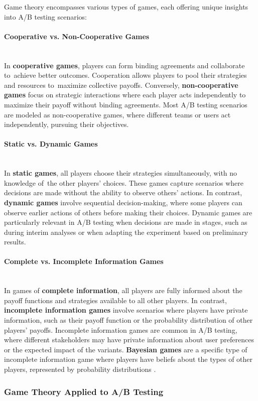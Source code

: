 \documentclass[magisterska, english]{pwr_wmat_praca_dyplomowa}
\theoremstyle{plain}
\numberwithin{theorem}{chapter}
\theoremstyle{definition}
\numberwithin{theorem}{chapter}
\newcommand{\myparagraph}[1]{\paragraph{#1}\mbox{}\\}
\begin{document}
Game theory encompasses various types of games, each offering unique insights into A/B testing scenarios:

\myparagraph{Cooperative vs. Non-Cooperative Games}

In \textbf{cooperative games}, players can form binding agreements and collaborate to~achieve better outcomes. Cooperation allows players to pool their strategies and resources to~maximize collective payoffs. Conversely, \textbf{non-cooperative games} focus on strategic interactions where each player acts independently to maximize their payoff without binding agreements. Most A/B testing scenarios are modeled as non-cooperative games, where different teams or users act independently, pursuing their objectives.

\myparagraph{Static vs. Dynamic Games}

In \textbf{static games}, all players choose their strategies simultaneously, with no knowledge of~the other players' choices. These games capture scenarios where decisions are made without the ability to observe others' actions. In contrast, \textbf{dynamic games} involve sequential decision-making, where some players can observe earlier actions of others before making their choices. Dynamic games are particularly relevant in A/B testing when decisions are made in stages, such as during interim analyses or when adapting the experiment based on preliminary results.

\myparagraph{Complete vs. Incomplete Information Games}

In games of \textbf{complete information}, all players are fully informed about the payoff functions and strategies available to all other players. In contrast, \textbf{incomplete information games} involve scenarios where players have private information, such as their payoff function or the probability distribution of other players' payoffs. Incomplete information games are common in A/B testing, where different stakeholders may have private information about user preferences or the expected impact of the variants. \textbf{Bayesian games} are a specific type of incomplete information game where players have beliefs about the types of other players, represented by probability distributions \cite{Harsanyi1967}.

\subsubsection{Game Theory Applied to A/B Testing}
\end{document}
